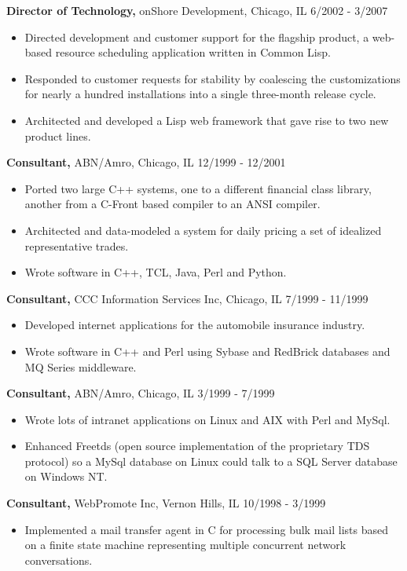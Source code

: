 \documentclass[margin]{res}
\begin{document}
\begin{resume}
 {\bf Director of Technology,} onShore Development, Chicago, IL \hfill 6/2002 - 3/2007
\begin{itemize} \itemsep -2pt 
\item Directed development and customer support for the flagship product, a web-based resource scheduling application written in Common Lisp.
\item Responded to customer requests for stability by coalescing the customizations for nearly a hundred installations into a single three-month release cycle.
\item Architected and developed a Lisp web framework that gave rise to two new product lines.
\end{itemize}

 {\bf Consultant,} ABN/Amro, Chicago, IL \hfill 12/1999 - 12/2001
\begin{itemize} \itemsep -2pt 
\item Ported two large C++ systems, one to a different financial class library, another from a C-Front based compiler to an ANSI compiler.
\item Architected and data-modeled a system for daily pricing a set of idealized representative trades.
\item Wrote software in C++, TCL, Java, Perl and Python.
\end{itemize}

 {\bf Consultant,} CCC Information Services Inc, Chicago, IL \hfill 7/1999 - 11/1999
\begin{itemize} \itemsep -2pt 
\item Developed internet applications for the automobile insurance industry.
\item Wrote software in C++ and Perl using Sybase and RedBrick databases and MQ Series middleware.
\end{itemize}

 {\bf Consultant,} ABN/Amro, Chicago, IL \hfill 3/1999 - 7/1999
\begin{itemize} \itemsep -2pt 
\item Wrote lots of intranet applications on Linux and AIX with Perl and MySql.
\item Enhanced Freetds (open source implementation of the proprietary TDS protocol) so a MySql database on Linux could talk to a SQL Server database on Windows NT.
\end{itemize}


 {\bf Consultant,} WebPromote Inc, Vernon Hills, IL \hfill 10/1998 - 3/1999
\begin{itemize} \itemsep -2pt 
\item Implemented a mail transfer agent in C for processing bulk mail lists based on a finite state machine representing multiple concurrent network conversations.
\end{itemize}


\end{resume}
\end{document}
